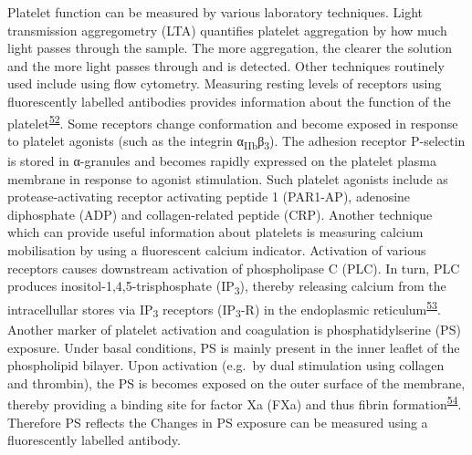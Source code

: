 \documentclass[11pt,twoside]{bristolthesis}
\begin{document}
Platelet function can be measured by various laboratory techniques. Light transmission aggregometry (LTA) quantifies platelet aggregation by how much light passes through the sample. The more aggregation, the clearer the solution and the more light passes through and is detected. Other techniques routinely used include using flow cytometry. Measuring resting levels of receptors using fluorescently labelled antibodies provides information about the function of the platelet\textsuperscript{\protect\hyperlink{ref-Hu2017}{52}}. Some receptors change conformation and become exposed in response to platelet agonists (such as the integrin α\textsubscript{IIb}β\textsubscript{3}). The adhesion receptor P-selectin is stored in α-granules and becomes rapidly expressed on the platelet plasma membrane in response to agonist stimulation. Such platelet agonists include as protease-activating receptor activating peptide 1 (PAR1-AP), adenosine diphosphate (ADP) and collagen-related peptide (CRP). Another technique which can provide useful information about platelets is measuring calcium mobilisation by using a fluorescent calcium indicator. Activation of various receptors causes downstream activation of phospholipase C (PLC). In turn, PLC produces inositol-1,4,5-trisphosphate (IP\textsubscript{3}), thereby releasing calcium from the intracellullar stores via IP\textsubscript{3} receptors (IP\textsubscript{3}-R) in the endoplasmic reticulum\textsuperscript{\protect\hyperlink{ref-Varga-Szabo2009}{53}}. Another marker of platelet activation and coagulation is phosphatidylserine (PS) exposure. Under basal conditions, PS is mainly present in the inner leaflet of the phospholipid bilayer. Upon activation (e.g.~by dual stimulation using collagen and thrombin), the PS is becomes exposed on the outer surface of the membrane, thereby providing a binding site for factor Xa (FXa) and thus fibrin formation\textsuperscript{\protect\hyperlink{ref-Bevers1983}{54}}. Therefore PS reflects the Changes in PS exposure can be measured using a fluorescently labelled antibody.
\end{document}
